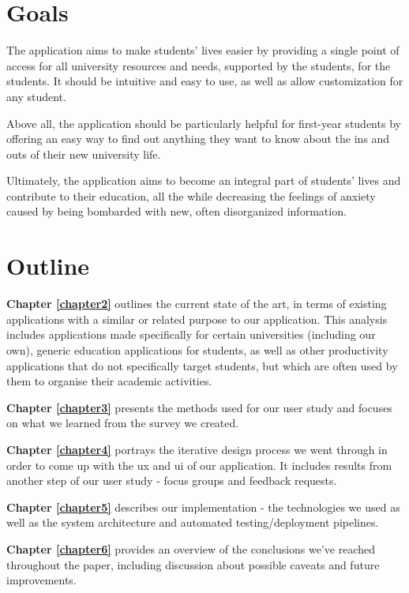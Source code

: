 \section{Goals} \label{1:goals}

    The application aims to make students' lives easier by providing a single point of access for all university resources and needs, supported by the students, for the students. It should be intuitive and easy to use, as well as allow customization for any student.
    
    Above all, the application should be particularly helpful for first-year students by offering an easy way to find out anything they want to know about the ins and outs of their new university life.
    
    Ultimately, the application aims to become an integral part of students' lives and contribute to their education, all the while decreasing the feelings of anxiety caused by being bombarded with new, often disorganized information.

\section{Outline} \label{1:outline}
    \textbf{Chapter \ref{chapter2}} outlines the current state of the art, in terms of existing applications with a similar or related purpose to our application. This analysis includes applications made specifically for certain universities (including our own), generic education applications for students, as well as other productivity applications that do not specifically target students, but which are often used by them to organise their academic activities.
    
    \textbf{Chapter \ref{chapter3}} presents the methods used for our user study and focuses on what we learned from the survey we created.
    
    \textbf{Chapter \ref{chapter4}} portrays the iterative design process we went through in order to come up with the \acrshort{ux} and \acrshort{ui} of our application. It includes results from another step of our user study - focus groups and feedback requests.
    
    \textbf{Chapter \ref{chapter5}} describes our implementation - the technologies we used as well as the system architecture and automated testing/deployment pipelines.
    
    \textbf{Chapter \ref{chapter6}} provides an overview of the conclusions we've reached throughout the paper, including discussion about possible caveats and future improvements.